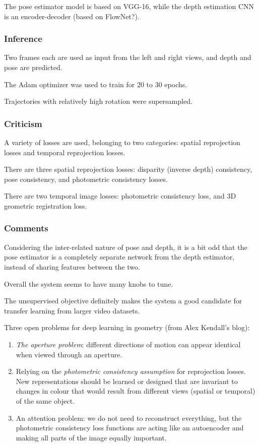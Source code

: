 \documentclass[a4paper, 12pt]{article}
\begin{document}
The pose estimator model is based on VGG-16, while the depth estimation CNN is
an encoder-decoder (based on FlowNet?).


\subsubsection{Inference}

Two frames each are used as input from the left and right views, and depth and
pose are predicted.

The Adam optimizer was used to train for 20 to 30 epochs.

Trajectories with relatively high rotation were supersampled.


\subsubsection{Criticism}

A variety of losses are used, belonging to two categories: spatial reprojection
losses and temporal reprojection losses.

There are three spatial reprojection losses: disparity (inverse depth)
consistency, pose consistency, and photometric consistency losses.

There are two temporal image losses: photometric consistency loss, and 3D
geometric registration loss.


\subsubsection{Comments}

Considering the inter-related nature of pose and depth, it is a bit odd that
the pose estimator is a completely separate network from the depth estimator,
instead of sharing features between the two.

Overall the system seems to have many knobs to tune.

The unsupervised objective definitely makes the system a good candidate for
transfer learning from larger video datasets.

Three open problems for deep learning in geometry (from Alex Kendall's blog):

\begin{enumerate}
        \item \emph{The aperture problem}: different directions of motion can
                appear identical when viewed through an aperture.

        \item Relying on the \emph{photometric consistency assumption} for
                reprojection losses. New representations should be learned or
                designed that are invariant to changes in colour that would
                result from different views (spatial or temporal) of the same
                object.

        \item An attention problem: we do not need to reconstruct everything,
                but the photometric consistency loss functions are acting like
                an autoencoder and making all parts of the image equally
                important.
\end{enumerate}




\end{document}
